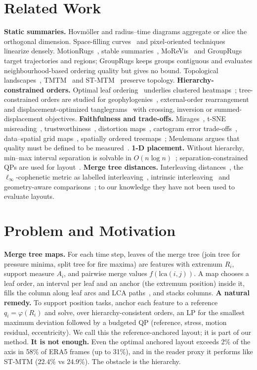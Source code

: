 \documentclass[10pt,twocolumn]{article}
\begin{document}
\section{Related Work}
\textbf{Static summaries.} Hovm\"oller and radius--time diagrams aggregate or slice the orthogonal dimension. Space-filling curves~\cite{franke2021,zhou2021} and pixel-oriented techniques~\cite{keim2000} linearize densely. MotionRugs~\cite{motionrugs}, stable summaries~\cite{wulms2021}, MoReVis~\cite{morevis} and GroupRugs~\cite{grouprugs} target trajectories and regions; GroupRugs keeps groups contiguous and evaluates neighbourhood-based ordering quality but gives no bound. Topological landscapes~\cite{weber2007,beketayev2012}, TMTM~\cite{tmtm} and ST-MTM~\cite{stmtm} preserve topology.
\textbf{Hierarchy-constrained orders.} Optimal leaf ordering~\cite{olo} underlies clustered heatmaps~\cite{eisen1998}; tree-constrained orders are studied for geophylogenies~\cite{geophylo}, external-order rearrangement~\cite{bulteau2022} and displacement-optimized tanglegrams~\cite{huson2026} with crossing, inversion or summed-displacement objectives.
\textbf{Faithfulness and trade-offs.} Mirages~\cite{mirages}, t-SNE misreading~\cite{tsne}, trustworthiness~\cite{venna}, distortion maps~\cite{aupetit,rauscher2026}, cartogram error trade-offs~\cite{cartograms}, data--spatial grid maps~\cite{gridmaps}, spatially ordered treemaps~\cite{wooddykes}; Meulemans argues that quality must be defined to be measured~\cite{meulemans2026}.
\textbf{1-D placement.} Without hierarchy, min--max interval separation is solvable in $O(n\log n)$~\cite{liwang}; separation-constrained QPs are used for layout~\cite{ipsep}.
\textbf{Merge tree distances.} Interleaving distances~\cite{morozov2013}, the $\ell_\infty$-cophenetic metric as labelled interleaving~\cite{munch2019}, intrinsic interleaving~\cite{gasparovic2024} and geometry-aware comparisons~\cite{yan2022}; to our knowledge they have not been used to evaluate layouts.

\section{Problem and Motivation}\label{sec:model}
\textbf{Merge tree maps.} For each time step, leaves of the merge tree (join tree for pressure minima, split tree for fire maxima) are features with extremum $R_i$, support measure $A_i$, and pairwise merge values $f(\mathrm{lca}(i,j))$. A map chooses a leaf order, an interval per leaf and an anchor (the extremum position) inside it, fills the column along leaf arcs and LCA paths~\cite{tmtm,stmtm}, and stacks columns.
\textbf{A natural remedy.} To support position tasks, anchor each feature to a reference $q_i=\varphi(R_i)$ and solve, over hierarchy-consistent orders, an LP for the smallest maximum deviation followed by a budgeted QP (reference, stress, motion residual, eccentricity). We call this the reference-anchored layout; it is part of our method.
\textbf{It is not enough.} Even the optimal anchored layout exceeds 2\% of the axis in 58\% of ERA5 frames (up to 31\%), and in the reader proxy it performs like ST-MTM (22.4\% vs 24.9\%). The obstacle is the hierarchy.
\end{document}
